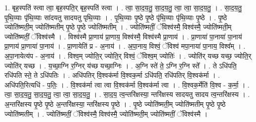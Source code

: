 \documentclass[17pt]{extarticle}
\begin{document}
1. बृह॒स्पति॑ स्त्वा त्वा॒ बृह॒स्पति॒र् बृह॒स्पति॑ स्त्वा । . त्वा॒ सा॒द॒य॒तु॒ सा॒द॒य॒तु॒ त्वा॒ त्वा॒ सा॒द॒य॒तु॒ । . सा॒द॒य॒तु॒ पृ॒थि॒व्याः पृ॑थि॒व्याः सा॑दयतु सादयतु पृथि॒व्याः । . पृ॒थि॒व्याः पृ॒ष्ठे पृ॒ष्ठे पृ॑थि॒व्याः पृ॑थि॒व्याः पृ॒ष्ठे । . पृ॒ष्ठे ज्योति॑ष्मती॒म् ज्योति॑ष्मतीम् पृ॒ष्ठे पृ॒ष्ठे ज्योति॑ष्मतीम् । . ज्योति॑ष्मतीं॒ ॅविश्व॑स्मै॒ विश्व॑स्मै॒ ज्योति॑ष्मती॒म् ज्योति॑ष्मतीं॒ ॅविश्व॑स्मै । . विश्व॑स्मै प्रा॒णाय॑ प्रा॒णाय॒ विश्व॑स्मै॒ विश्व॑स्मै प्रा॒णाय॑ । . प्रा॒णाया॑ पा॒नाया॑ पा॒नाय॑ प्रा॒णाय॑ प्रा॒णाया॑ पा॒नाय॑ । . प्रा॒णायेति॑ प्र - अ॒नाय॑ । . अ॒पा॒नाय॒ विश्वं॒ ॅविश्व॑ मपा॒नाया॑ पा॒नाय॒ विश्व᳚म् । . अ॒पा॒नायेत्य॑प - अ॒नाय॑ । . विश्व॒म् ज्योति॒र् ज्योति॒र् विश्वं॒ ॅविश्व॒म् ज्योतिः॑ । . ज्योति॑र् यच्छ यच्छ॒ ज्योति॒र् ज्योति॑र् यच्छ । . य॒च्छा॒ग्नि र॒ग्निर् य॑च्छ यच्छा॒ग्निः । . अ॒ग्नि स्ते॑ ते॒ ऽग्नि र॒ग्नि स्ते᳚ । . ते ऽधि॑पति॒ रधि॑पति स्ते॒ ते ऽधि॑पतिः । . अधि॑पतिर् वि॒श्वक॑र्मा वि॒श्वक॒र्मा ऽधि॑पति॒ रधि॑पतिर् वि॒श्वक॑र्मा । . अधि॑पति॒रित्यधि॑ - प॒तिः॒ । . वि॒श्वक॑र्मा त्वा त्वा वि॒श्वक॑र्मा वि॒श्वक॑र्मा त्वा । . वि॒श्वक॒र्मेति॑ वि॒श्व - क॒र्मा॒ । . त्वा॒ सा॒द॒य॒तु॒ सा॒द॒य॒तु॒ त्वा॒ त्वा॒ सा॒द॒य॒तु॒ । . सा॒द॒य॒ त्व॒न्तरि॑क्षस्या॒ न्तरि॑क्षस्य सादयतु सादय त्व॒न्तरि॑क्षस्य । . अ॒न्तरि॑क्षस्य पृ॒ष्ठे पृ॒ष्ठे अ॒न्तरि॑क्षस्या॒ न्तरि॑क्षस्य पृ॒ष्ठे । . पृ॒ष्ठे ज्योति॑ष्मती॒म् ज्योति॑ष्मतीम् पृ॒ष्ठे पृ॒ष्ठे ज्योति॑ष्मतीम् । . ज्योति॑ष्मतीं॒ ॅविश्व॑स्मै॒ विश्व॑स्मै॒ ज्योति॑ष्मती॒म् ज्योति॑ष्मतीं॒ ॅविश्व॑स्मै । \newline
\end{document}
